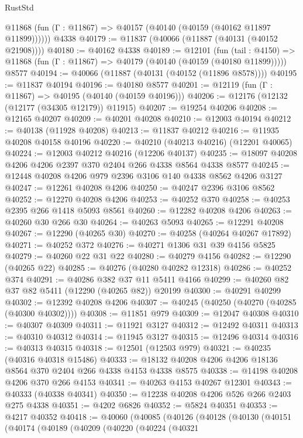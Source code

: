 \begin{lexlean}{RustStd}
\begin{coremodule}
      @11868 (fun (Γ : @11867) => @40157 (@40140 (@40159 (@40162 @11897 @11899))))))
    @4338
@40179 := @11837 (@40066 (@11887 (@40131 (@40152 @21908))))
@40180 := @40162 @4338
@40189 := @12101
    (fun (tail : @4150) => @11868 (fun (Γ : @11867) => @40179 (@40140 (@40159 (@40180 @11899)))))
    @8577
@40194 := @40066 (@11887 (@40131 (@40152 (@11896 @8578))))
@40195 := @11837 @40194
@40196 := @40180 @8577
@40201 := @12119 (fun (Γ : @11867) => @40195 (@40140 (@40159 @40196)))
@40206 := @12176 (@12132 (@12177 (@34305 @12179)) @11915)
@40207 := @19254 @40206
@40208 := @12165 @40207
@40209 := @40201 @40208
@40210 := @12003 @40194
@40212 := @40138 (@11928 @40208)
@40213 := @11837 @40212
@40216 := @11935 @40208 @40158 @40196
@40220 := @40210 (@40213 @40216) (@12201 @40065)
@40224 := @12003 @40212 @40216 (@12206 @40137)
@40235 := @18097 @40208 @4206 @4206 @2397 @370 @2404 @266 @4338 @8564 @4338 @8577
@40245 := @12448 @40208 @4206 @979 @2396 @3106 @140 @4338 @8562 @4206 @3127
@40247 := @12261 @40208 @4206
@40250 := @40247 @2396 @3106 @8562
@40252 := @12270 @40208 @4206
@40253 := @40252 @370
@40258 := @40253 @2395 @266 @1418 @5093 @8561
@40260 := @12282 @40208 @4206
@40263 := @40260 @30 @266 @30
@40264 := @40263 @5093
@40265 := @12291 @40208
@40267 := @12290 (@40265 @30)
@40270 := @40258 (@40264 @40267 @17892)
@40271 := @40252 @372
@40276 := @40271 @1306 @31 @39 @4156 @5825
@40279 := @40260 @22 @31 @22
@40280 := @40279 @4156
@40282 := @12290 (@40265 @22)
@40285 := @40276 (@40280 @40282 @12318)
@40286 := @40252 @374
@40291 := @40286 @382 @37 @11 @5411 @4166
@40299 := @40260 @82 @37 @82 @5411 (@12290 (@40265 @82)) @20199
@40300 := @40291 @40299
@40302 := @12392 @40208 @4206
@40307 := @40245 (@40250 (@40270 (@40285 (@40300 @40302))))
@40308 := @11851 @979
@40309 := @12047 @40308
@40310 := @40307 @40309
@40311 := @11921 @3127
@40312 := @12492 @40311
@40313 := @40310 @40312
@40314 := @11945 @3127
@40315 := @12496 @40314
@40316 := @40313 @40315
@40318 := @12501 (@12503 @979)
@40321 := @40235 (@40316 @40318 @15486)
@40333 := @18132 @40208 @4206 @4206 @18136 @8564 @370 @2404 @266 @4338 @4153 @4338 @8575
@40338 := @14198 @40208 @4206 @370 @266 @4153
@40341 := @40263 @4153 @40267 @12301
@40343 := @40333 (@40338 @40341)
@40350 := @12238 @40208 @4206 @526 @266 @2403 @275 @4338
@40351 := @4202 @6826
@40352 := @5824 @40351
@40353 := @4217 @40352
@40418 := @40060
    (@40085
      (@40126
        (@40128
          (@40130
            (@40151
              (@40174
                (@40189
                  (@40209
                    (@40220
                      (@40224
                        (@40321

\end{coremodule}
\end{lexlean}
